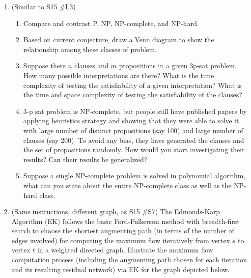 \begin{enumerate}
	\item	(Similar to S15 \#L3)
	\begin{enumerate}[label=\alph*.]
		\item Compare and contrast P, NP, NP-complete, and NP-hard.
		\item Based on current conjecture, draw a Venn diagram to show the relationship among these classes of problem.
		\item Suppose there $n$ clauses and $m$ propositions in a given 3p-sat problem.  How many possible interpretations are there?  What is the time complexity of testing the satisfiability of a given interpretation?  What is the time and space complexity of testing the satisfiability of the clauses?
		\item 3-p sat problem is NP-complete, but people still have published papers by applying heuristics strategy and showing that they were able to solve it with large number of distinct propositions (say 100) and large number of clauses (say 200).  To avoid any bias, they have generated the clauses and the set of propositions randomly.  How would you start investigating their results?  Can their results be generalized?
		\item Suppose a single NP-complete problem is solved in polynomial algorithm, what can you state about the entire NP-complete class as well as the NP-hard class.
		
	\end{enumerate}

	
	\item (Same instructions, different graph, as S15 \#S7)
	The Edmonds-Karp Algorithm (EK) follows the basic Ford-Fulkerson method with breadth-first search to choose the shortest augmenting path (in terms of the number of edges involved) for computing the maximum flow iteratively from vertex $s$ to vertex $t$ in a weighted directed graph.  Illustrate the maximum flow computation process (including the augmenting path chosen for each iteration and its resulting residual network) via EK for the graph depicted below.  
	
\hfil{}


\end{enumerate}
